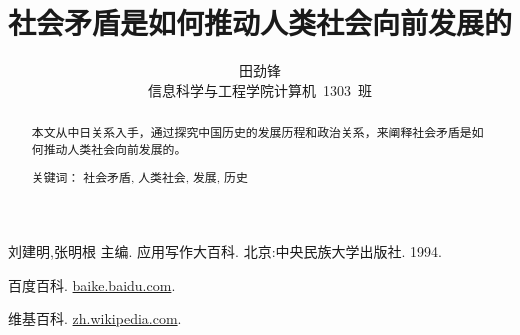 \documentclass[cs4size,a4paper,nofonts]{ctexart}
\def\tjf{田劲锋}
\def\titlec{社会矛盾是如何推动人类社会向前发展的}
\begin{document}

\title{\titlec}
\author{\tjf\\
信息科学与工程学院\quad 计算机~1303~班}
\maketitle

\begin{abstract}
本文从中日关系入手，通过探究中国历史的发展历程和政治关系，来阐释社会矛盾是如何推动人类社会向前发展的。

关键词： 社会矛盾, 人类社会, 发展, 历史
\end{abstract}

\tableofcontents



\begin{thebibliography}{10}
\item 刘建明,张明根 主编. 应用写作大百科. 北京:中央民族大学出版社. 1994.
\item 百度百科. \url{baike.baidu.com}.
\item 维基百科. \url{zh.wikipedia.com}.
\end{thebibliography}

\end{document}
